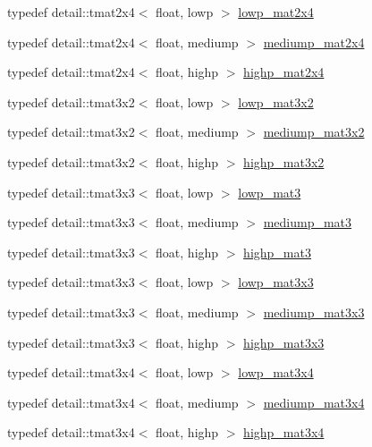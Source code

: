 \begin{CompactItemize}
typedef detail::tmat2x4$<$ float, lowp $>$ \hyperlink{group__core__precision_ga62e33ee2864909c8522a549fbf40ce5}{lowp\_\-mat2x4}
\item 
typedef detail::tmat2x4$<$ float, mediump $>$ \hyperlink{group__core__precision_ge90cf4be1ded03a3a5b7b42045da253c}{mediump\_\-mat2x4}
\item 
typedef detail::tmat2x4$<$ float, highp $>$ \hyperlink{group__core__precision_g3cc506666b7a95db56f9d2eb787b6e20}{highp\_\-mat2x4}
\item 
typedef detail::tmat3x2$<$ float, lowp $>$ \hyperlink{group__core__precision_g17219f89f804dbf4620d4caacf32cfe2}{lowp\_\-mat3x2}
\item 
typedef detail::tmat3x2$<$ float, mediump $>$ \hyperlink{group__core__precision_g1215b70c2750b6e9ab813ced8dcae568}{mediump\_\-mat3x2}
\item 
typedef detail::tmat3x2$<$ float, highp $>$ \hyperlink{group__core__precision_gbc7767293ff69cd56717ee9d8be62963}{highp\_\-mat3x2}
\item 
typedef detail::tmat3x3$<$ float, lowp $>$ \hyperlink{group__core__precision_gae2935658c6a3668ac1935a7f6064d51}{lowp\_\-mat3}
\item 
typedef detail::tmat3x3$<$ float, mediump $>$ \hyperlink{group__core__precision_gcf45e22f1fb2703b181995676963a1f9}{mediump\_\-mat3}
\item 
typedef detail::tmat3x3$<$ float, highp $>$ \hyperlink{group__core__precision_g334034520a655db41a2e188951f6aaad}{highp\_\-mat3}
\item 
typedef detail::tmat3x3$<$ float, lowp $>$ \hyperlink{group__core__precision_g31688b397d10806ead332c3adb7dc0f0}{lowp\_\-mat3x3}
\item 
typedef detail::tmat3x3$<$ float, mediump $>$ \hyperlink{group__core__precision_ge4c7f0d5d3dab712f9a671183e63e5ab}{mediump\_\-mat3x3}
\item 
typedef detail::tmat3x3$<$ float, highp $>$ \hyperlink{group__core__precision_g8a3703cc71cdfc8928eddf46b3763c4b}{highp\_\-mat3x3}
\item 
typedef detail::tmat3x4$<$ float, lowp $>$ \hyperlink{group__core__precision_g9cea06e7378fe59abf95c1f56edc4320}{lowp\_\-mat3x4}
\item 
typedef detail::tmat3x4$<$ float, mediump $>$ \hyperlink{group__core__precision_g5654236019c6a732844da31534a3cf28}{mediump\_\-mat3x4}
\item 
typedef detail::tmat3x4$<$ float, highp $>$ \hyperlink{group__core__precision_gbaf9c8dd35db715b1093042703f879d0}{highp\_\-mat3x4}

\end{CompactItemize}

